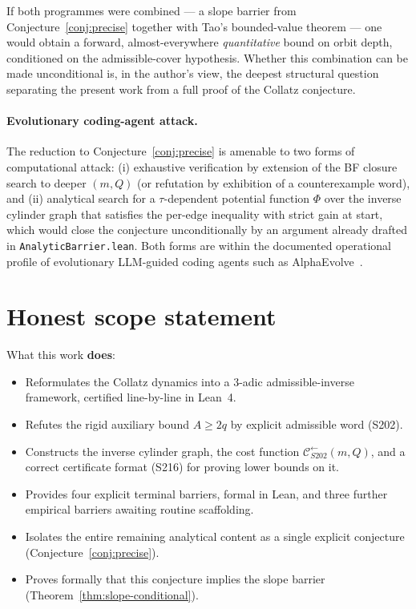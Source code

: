 \documentclass[11pt,a4paper]{article}
\theoremstyle{plain}
\theoremstyle{definition}
\newcommand{\Cback}{\mathcal{C}^{\!\leftarrow}_{S202}}
\begin{document}
If both programmes were combined --- a slope barrier from
Conjecture~\ref{conj:precise} together with Tao's bounded-value
theorem --- one would obtain a forward, almost-everywhere
\emph{quantitative} bound on orbit depth, conditioned on the
admissible-cover hypothesis. Whether this combination can be made
unconditional is, in the author's view, the deepest structural
question separating the present work from a full proof of the
Collatz conjecture.

\paragraph{Evolutionary coding-agent attack.}
The reduction to Conjecture~\ref{conj:precise} is amenable to two
forms of computational attack: (i) exhaustive verification by
extension of the BF closure search to deeper $(m, Q)$ (or refutation
by exhibition of a counterexample word), and (ii) analytical search
for a $\tau$-dependent potential function $\Phi$ over the inverse
cylinder graph that satisfies the per-edge inequality with strict
gain at start, which would close the conjecture unconditionally
by an argument already drafted in
\texttt{AnalyticBarrier.lean}. Both forms are within the
documented operational profile of evolutionary
LLM-guided coding agents such as AlphaEvolve~\cite{alphaevolve2025}.

\section{Honest scope statement}\label{sec:scope}

What this work \textbf{does}:
\begin{itemize}
  \item Reformulates the Collatz dynamics into a 3-adic
        admissible-inverse framework, certified line-by-line in
        Lean~4.
  \item Refutes the rigid auxiliary bound $A \ge 2q$ by explicit
        admissible word (S202).
  \item Constructs the inverse cylinder graph, the cost function
        $\Cback(m, Q)$, and a correct certificate format (S216)
        for proving lower bounds on it.
  \item Provides four explicit terminal barriers, formal in Lean,
        and three further empirical barriers awaiting routine
        scaffolding.
  \item Isolates the entire remaining analytical content as a single
        explicit conjecture (Conjecture~\ref{conj:precise}).
  \item Proves formally that this conjecture implies the slope
        barrier (Theorem~\ref{thm:slope-conditional}).
\end{itemize}
\end{document}

